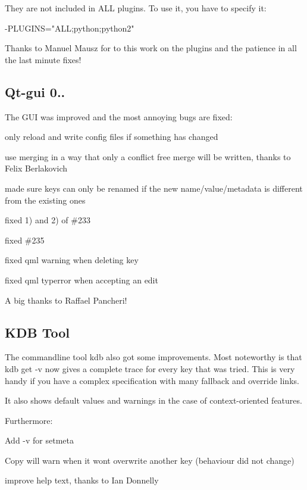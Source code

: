 They are not included in {\ttfamily A\+LL} plugins. To use it, you have to specify it\+:


\begin{DoxyCode}
-PLUGINS="ALL;python;python2"
\end{DoxyCode}


Thanks to Manuel Mausz for to this work on the plugins and the patience in all the last minute fixes!

\subsection*{Qt-\/gui 0..}

The G\+UI was improved and the most annoying bugs are fixed\+:


\begin{DoxyItemize}
\item only reload and write config files if something has changed
\item use merging in a way that only a conflict free merge will be written, thanks to Felix Berlakovich
\item made sure keys can only be renamed if the new name/value/metadata is different from the existing ones
\item fixed 1) and 2) of \#233
\item fixed \#235
\item fixed qml warning when deleting key
\item fixed qml typerror when accepting an edit
\end{DoxyItemize}

A big thanks to Raffael Pancheri!

\subsection*{K\+DB Tool}

The commandline tool {\ttfamily kdb} also got some improvements. Most noteworthy is that {\ttfamily kdb get -\/v} now gives a complete trace for every key that was tried. This is very handy if you have a complex specification with many fallback and override links.

It also shows default values and warnings in the case of context-\/oriented features.

Furthermore\+:


\begin{DoxyItemize}
\item Add {\ttfamily -\/v} for setmeta
\item Copy will warn when it won\textquotesingle{}t overwrite another key (behaviour did not change)
\item improve help text, thanks to Ian Donnelly
\end{DoxyItemize}

